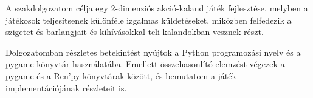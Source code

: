A szakdolgozatom célja egy 2-dimenziós akció-kaland játék fejlesztése, melyben a játékosok teljesítsenek különféle izgalmas küldetéseket, miközben felfedezik a szigetet és barlangjait és kihívásokkal teli kalandokban vesznek részt.

Dolgozatomban részletes betekintést nyújtok a Python programozási nyelv és a pygame könyvtár használatába. Emellett összehasonlító elemzést végezek a pygame és a Ren'py könyvtárak között, és bemutatom a játék implementációjának részleteit is.
